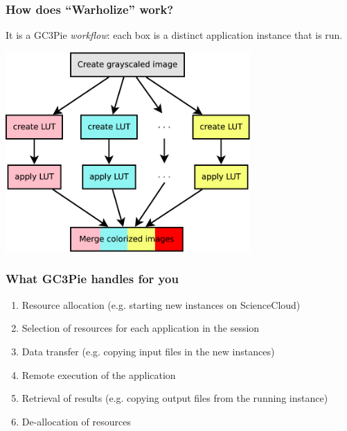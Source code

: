 \documentclass[english,serif,mathserif,usenames,dvipsnames]{beamer}
\begin{document}
\begin{frame}
  \frametitle{How does ``Warholize'' work?}

  \begin{center}
    It is a GC3Pie \emph{workflow}: each box is a distinct application
    instance that is run.

    \+
    \includegraphics[width=0.70\textwidth]{fig/warholize-wkf}
  \end{center}
\end{frame}


\begin{frame}
  \frametitle{What GC3Pie handles for you}

  \begin{enumerate}\small
  \item Resource allocation (e.g. starting new instances on
    ScienceCloud)
  \item Selection of resources for each application in the session
  \item Data transfer (e.g. copying input files in the new instances)
  \item Remote execution of the application
  \item Retrieval of results (e.g. copying output files from the
    running instance)
  \item De-allocation of resources
  \end{enumerate}

\end{frame}


\end{document}
